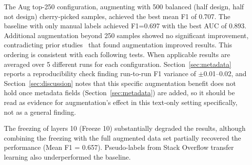 \documentclass[preprint,12pt]{elsarticle}
\begin{document}
The Aug top-250 configuration, augmenting with 500 balanced (half design, half not design) cherry-picked samples, achieved the best mean F1 of 0.707. The baseline with only manual labels achieved F1=0.697 with the best AUC of 0.893. Additional augmentation beyond 250 samples showed no significant improvement, contradicting prior studies~\cite{nam2013, uddin2022} that found augmentation improved results. This ordering is consistent with each following tests. When applicable results are averaged over 5 different runs for each configuration. Section~\ref{sec:metadata} reports a reproducibility check finding run-to-run F1 variance of $\pm$0.01--0.02, and Section~\ref{sec:discussion} notes that this specific augmentation benefit does not hold once metadata fields (Section~\ref{sec:metadata}) are added, so it should be read as evidence for augmentation's effect in this text-only setting specifically, not as a general finding.

The freezing of layers 10 (Freeze 10) substantially degraded the results, although combining the freezing with the full augmented data set partially recovered the performance (Mean F1 = 0.657). Pseudo-labels from Stack Overflow transfer learning also underperformed the baseline.
\end{document}
